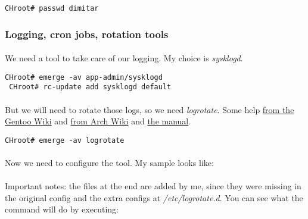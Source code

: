 \documentclass[10pt,a4paper]{article}
\begin{document}
                    \begin{lstlisting}[style=BashInputCHRoot]
 CHroot# passwd dimitar
                    \end{lstlisting}

                \newpage
                \subsubsection{Logging, cron jobs, rotation tools}

                    \paragraph{} We need a tool to take care of our logging. My choice is \textit{sysklogd}.

                    \begin{lstlisting}[style=BashInputCHRoot]
 CHroot# emerge -av app-admin/sysklogd
 CHroot# rc-update add sysklogd default
                    \end{lstlisting}

                    \paragraph{} But we will need to rotate those logs, so we need \textit{logrotate}. Some help \href{https://wiki.gentoo.org/wiki/Logrotate}{from the Gentoo Wiki} and \href{https://wiki.archlinux.org/index.php/logrotate}{from Arch Wiki} and \href{https://linuxconfig.org/logrotate-8-manual-page}{the manual}.

                    \begin{lstlisting}[style=BashInputCHRoot]
 CHroot# emerge -av logrotate
                    \end{lstlisting}

                    \paragraph{} Now we need to configure the tool. My sample looks like:



                    \paragraph{} Important notes: the files at the end are added by me, since they were missing in the original config and the extra configs at \textit{/etc/logrotate.d}. You can see what the command will do by executing:
\end{document}
